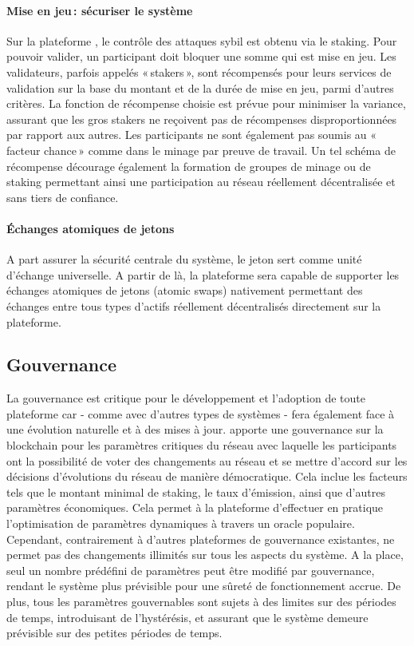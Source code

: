 \documentclass[runningheads,francais,a4paper]{llncs}
\begin{document}
\paragraph{Mise en jeu\,: sécuriser le système}
Sur la plateforme \AVAPlatformName{}, le contrôle des attaques sybil est obtenu via le staking. Pour pouvoir valider, un
participant doit bloquer une somme qui est mise en jeu. Les validateurs, parfois appelés «\,stakers\,», sont récompensés
pour leurs services de validation sur la base du montant et de la durée de mise en jeu, parmi d'autres critères. La
fonction de récompense choisie est prévue pour minimiser la variance, assurant que les gros stakers ne reçoivent pas de
récompenses disproportionnées par rapport aux autres. Les participants ne sont également pas soumis au
«\,facteur chance\,» comme dans le minage par preuve de travail. Un tel schéma de récompense décourage également la
formation de groupes de minage ou de staking permettant ainsi une participation au réseau réellement décentralisée et
sans tiers de confiance.

\paragraph{Échanges atomiques de jetons}
A part assurer la sécurité centrale du système, le jeton \AVATokenName{} sert comme unité d'échange universelle. A
partir de là, la plateforme \AVAPlatformName{} sera capable de supporter les échanges atomiques de jetons (atomic swaps)
nativement permettant des échanges entre tous types d'actifs réellement décentralisés directement sur la plateforme.

\subsection{Gouvernance}
La gouvernance est critique pour le développement et l'adoption de toute plateforme car - comme avec d'autres types de
systèmes - \AVAPlatformName{} fera également face à une évolution naturelle et à des mises à jour. \AVATokenName{}
apporte une gouvernance sur la blockchain pour les paramètres critiques du réseau avec laquelle les participants ont la
possibilité de voter des changements au réseau et se mettre d'accord sur les décisions d'évolutions du réseau de manière
démocratique. Cela inclue les facteurs tels que le montant minimal de staking, le taux d'émission, ainsi que d'autres
paramètres économiques. Cela permet à la plateforme d'effectuer en pratique l'optimisation de paramètres dynamiques à
travers un oracle populaire. Cependant, contrairement à d'autres plateformes de gouvernance existantes,
\AVAPlatformName{} ne permet pas des changements illimités sur tous les aspects du système. A la place, seul un nombre
prédéfini de paramètres peut être modifié par gouvernance, rendant le système plus prévisible pour une sûreté de
fonctionnement accrue. De plus, tous les paramètres gouvernables sont sujets à des limites sur des périodes de temps,
introduisant de l'hystérésis, et assurant que le système demeure prévisible sur des petites périodes de temps.
\end{document}
